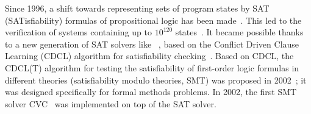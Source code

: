 Since 1996, a shift towards representing sets of program states by SAT (SATisfiability) formulas of propositional logic has been made~\cite{10.5555/1864519.1864564}. This led to the verification of systems containing up to $10^{120}$ states~\cite{10.1007/3-540-61474-5_93}.
It became possible thanks to a new generation of SAT solvers like \chaff{}~\cite{10.1145/378239.379017}, based on the Conflict Driven Clause Learning (CDCL) algorithm for satisfiability checking~\cite{silva1996grasp}.
Based on CDCL, the CDCL(T) algorithm for testing the satisfiability of first-order logic formulas in different theories (satisfiability modulo theories, SMT) was proposed in 2002~\cite{10.1007/3-540-45757-7_26}; it was designed specifically for formal methods problems.
In 2002, the first SMT solver \textsc{CVC}~\cite{10.1007/3-540-45657-0_40} was implemented on top of the \chaff{} SAT solver.

